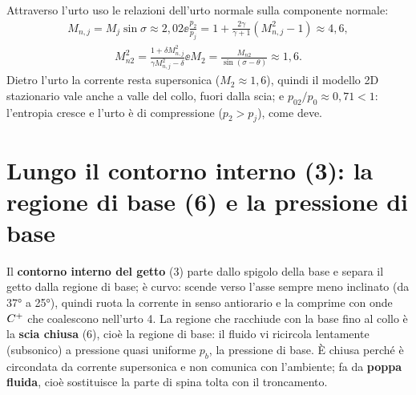 Attraverso l'urto uso le relazioni dell'urto normale sulla componente normale:
\begin{gather*}
M_{n,j}=M_j\sin\sigma\approx2{,}02 \ee
\frac{p_2}{p_j}=1+\frac{2\gamma}{\gamma+1}\left(M_{n,j}^2-1\right)\approx4{,}6,
\end{gather*}
\begin{gather*}
M_{n2}^2=\frac{1+\delta M_{n,j}^2}{\gamma M_{n,j}^2-\delta} \ee
M_2=\frac{M_{n2}}{\sin(\sigma-\theta)}\approx1{,}6 .
\end{gather*}
Dietro l'urto la corrente resta supersonica ($M_2\approx1{,}6$), quindi il modello 2D stazionario vale anche a valle
del collo, fuori dalla scia; e $p_{02}/p_0\approx0{,}71<1$: l'entropia cresce e l'urto è di compressione
($p_2>p_j$), come deve.

\section*{Lungo il contorno interno (3): la regione di base (6) e la pressione di base}
Il \textbf{contorno interno del getto} (3) parte dallo spigolo della base e separa il getto dalla regione di base;
è curvo: scende verso l'asse sempre meno inclinato (da \ang{37} a \ang{25}), quindi ruota la corrente in senso
antiorario e la comprime con onde $C^{+}$ che coalescono nell'urto 4. La regione che racchiude con la base fino al
collo è la \textbf{scia chiusa} (6), cioè la regione di base: il fluido vi ricircola lentamente (subsonico) a
pressione quasi uniforme $p_b$, la pressione di base. È chiusa perché è circondata da corrente supersonica e non
comunica con l'ambiente; fa da \textbf{poppa fluida}, cioè sostituisce la parte di spina tolta con il troncamento.

